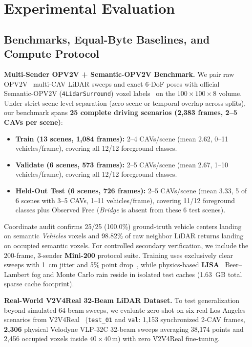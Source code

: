 \documentclass[journal]{IEEEtran}
\begin{document}
\section{Experimental Evaluation}
\label{sec:experiments}

\subsection{Benchmarks, Equal-Byte Baselines, and Compute Protocol}

\textbf{Multi-Sender OPV2V + Semantic-OPV2V Benchmark.} We pair raw OPV2V~\cite{xu2022opv2v} multi-CAV LiDAR sweeps and exact 6-DoF poses with official Semantic-OPV2V (\texttt{4LidarSurround}) voxel labels~\cite{song2024cohff} on the $100\times 100\times 8$ volume. Under strict scene-level separation (zero scene or temporal overlap across splits), our benchmark spans \textbf{25 complete driving scenarios (2,383 frames, 2--5 CAVs per scene)}:
\begin{itemize}
\item \textbf{Train (13 scenes, 1,084 frames):} 2--4 CAVs/scene (mean 2.62, 0--11 vehicles/frame), covering all 12/12 foreground classes.
\item \textbf{Validate (6 scenes, 573 frames):} 2--5 CAVs/scene (mean 2.67, 1--10 vehicles/frame), covering all 12/12 foreground classes.
\item \textbf{Held-Out Test (6 scenes, 726 frames):} 2--5 CAVs/scene (mean 3.33, 5 of 6 scenes with 3--5 CAVs, 1--11 vehicles/frame), covering 11/12 foreground classes plus Observed Free (\textit{Bridge} is absent from these 6 test scenes).
\end{itemize}
Coordinate audit confirms 25/25 (100.0\%) ground-truth vehicle centers landing on semantic \textit{Vehicles} voxels and 98.82\% of raw neighbor LiDAR returns landing on occupied semantic voxels. For controlled secondary verification, we include the 200-frame, 3-sender \textbf{Mini-200} protocol suite. Training uses exclusively clear sweeps with 1~cm jitter and 5\% point drop~\cite{park2024lidarweather}, while physics-based \textbf{LISA}~\cite{kilic2021lisa} Beer--Lambert fog and Monte Carlo rain reside in isolated test caches (1.63~GB total sparse cache footprint).

\textbf{Real-World V2V4Real 32-Beam LiDAR Dataset.} To test generalization beyond simulated 64-beam sweeps, we evaluate zero-shot on six real Los Angeles scenarios from V2V4Real~\cite{xu2023v2v4real} (\texttt{test\_01} and \texttt{val}: 1,153 synchronized 2-CAV frames, \textbf{2,306} physical Velodyne VLP-32C 32-beam sweeps averaging 38,174 points and 2,456 occupied voxels inside $40\times 40\,\mathrm{m}$) with zero V2V4Real fine-tuning.
\end{document}

